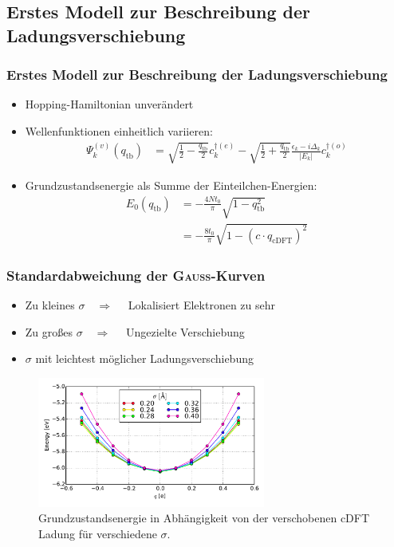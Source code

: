 \subsection{Erstes Modell zur Beschreibung der Ladungsverschiebung}
\begin{frame}
\frametitle{Erstes Modell zur Beschreibung der Ladungsverschiebung}
\begin{itemize}
\item Hopping-Hamiltonian unverändert
\item Wellenfunktionen einheitlich variieren:
\begin{align*}
\Psi_k^{(v)}(q_\text{tb}) &= \sqrt{\frac{1}{2}-\frac{q_\text{tb}}{2}}c_k^{\dagger(e)}- \sqrt{\frac{1}{2}+\frac{q_\text{tb}}{2}}\frac{\epsilon_k - i \Delta_k}{|E_k|}c_{k}^{\dagger(o)}
\end{align*}
\item Grundzustandsenergie als Summe der Einteilchen-Energien:
\begin{align*}
E_0(q_\text{tb}) &= -\frac{4Nt_0}{\pi} \sqrt{1-q^2_\text{tb}}\\
&= -\frac{8t_0}{\pi} \sqrt{1 - \left(c\cdot q_\text{cDFT}\right)^2}
\end{align*}
\end{itemize}
\end{frame}

\begin{frame}
\frametitle{Standardabweichung der \textsc{Gauß}-Kurven}
\begin{itemize}
\item Zu kleines $\sigma\quad\Rightarrow\quad$ Lokalisiert Elektronen zu sehr
\item Zu großes $\sigma\quad\Rightarrow\quad$ Ungezielte Verschiebung
\item $\sigma$ mit leichtest möglicher Ladungsverschiebung
\end{itemize}
\begin{figure}[!t]
	\centering
	\includegraphics[width = 7.5cm]{Images/Hydrogen/charging/gaussian_sigmas}
	\caption{Grundzustandsenergie in Abhängigkeit von der verschobenen cDFT Ladung für verschiedene $\sigma$.}
	\label{image_gaussian_sigmas_hydrogen}
\end{figure}
\end{frame}

